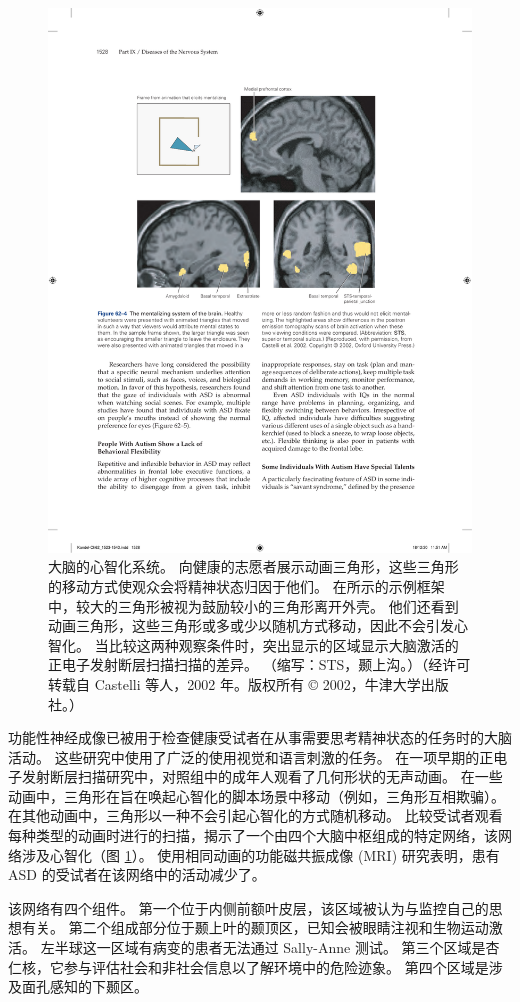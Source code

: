 \begin{figure}[htbp]
	\centering
	\includegraphics[width=0.75\linewidth]{chap62/fig_62_4}
	\caption{大脑的心智化系统。 向健康的志愿者展示动画三角形，这些三角形的移动方式使观众会将精神状态归因于他们。 在所示的示例框架中，较大的三角形被视为鼓励较小的三角形离开外壳。 他们还看到动画三角形，这些三角形或多或少以随机方式移动，因此不会引发心智化。 当比较这两种观察条件时，突出显示的区域显示大脑激活的正电子发射断层扫描扫描的差异。 （缩写：STS，颞上沟。）（经许可转载自 Castelli 等人，2002 年。版权所有 © 2002，牛津大学出版社。）}
	\label{fig:62_4}
\end{figure}


功能性神经成像已被用于检查健康受试者在从事需要思考精神状态的任务时的大脑活动。
这些研究中使用了广泛的使用视觉和语言刺激的任务。
在一项早期的正电子发射断层扫描研究中，对照组中的成年人观看了几何形状的无声动画。
在一些动画中，三角形在旨在唤起心智化的脚本场景中移动（例如，三角形互相欺骗）。
在其他动画中，三角形以一种不会引起心智化的方式随机移动。
比较受试者观看每种类型的动画时进行的扫描，揭示了一个由四个大脑中枢组成的特定网络，该网络涉及心智化（图 \ref{fig:62_4}）。
使用相同动画的功能磁共振成像 (MRI) 研究表明，患有 ASD 的受试者在该网络中的活动减少了。


该网络有四个组件。
第一个位于内侧前额叶皮层，该区域被认为与监控自己的思想有关。
第二个组成部分位于颞上叶的颞顶区，已知会被眼睛注视和生物运动激活。
左半球这一区域有病变的患者无法通过 Sally-Anne 测试。
第三个区域是杏仁核，它参与评估社会和非社会信息以了解环境中的危险迹象。
第四个区域是涉及面孔感知的下颞区。


